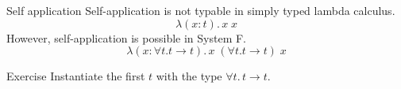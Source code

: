 %  

\begin{frame}{Self application}
Self-application is not typable in simply typed lambda calculus. 
  \[
    \lambda (x : t).\, x\; x
  \]
  However, self-application is possible in System F. 
  \[
    \lambda (x : \forall t. t\to t).\, x\;(\forall t. t\to t)\;x
  \]
  \begin{block}{Exercise}
    Instantiate the first $t$ with the type $\forall t.\, t \to t$.  
  \end{block}
\end{frame}

